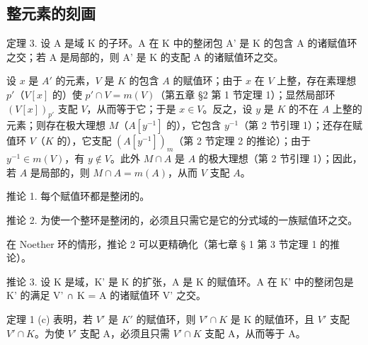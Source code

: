 \subsection{整元素的刻画}

定理 3. 设 A 是域 K 的子环。A 在 K 中的整闭包 A' 是 K 的包含 A 的诸赋值环之交；若 A 是局部的，则 A' 是 K 的支配 A 的诸赋值环之交。

设 \(x\) 是 \(A'\) 的元素，\(V\) 是 \(K\) 的包含 \(A\) 的赋值环；由于 \(x\) 在 \(V\) 上整，存在素理想 \(p'\)（\(V[x]\) 的）使 \(p' \cap V = m(V)\)（第五章 §2 第 1 节定理 1）；显然局部环 \((V[x])_{p'}\) 支配 \(V\)，从而等于它；于是 \(x \in V\)。反之，设 \(y\) 是 \(K\) 的不在 \(A\) 上整的元素；则存在极大理想 \(M\)（\(A[y^{-1}]\) 的），它包含 \(y^{-1}\)（第 2 节引理 1）；还存在赋值环 \(V\)（\(K\) 的），它支配 \((A[y^{-1}])_{m}\)（第 2 节定理 2 的推论）；由于 \(y^{-1} \in m(V)\)，有 \(y \notin V\)。此外 \(M \cap A\) 是 \(A\) 的极大理想（第 2 节引理 1）；因此，若 \(A\) 是局部的，则 \(M \cap A = m(A)\)，从而 \(V\) 支配 \(A\)。

推论 1. 每个赋值环都是整闭的。

推论 2. 为使一个整环是整闭的，必须且只需它是它的分式域的一族赋值环之交。

在 Noether 环的情形，推论 2 可以更精确化（第七章 § 1 第 3 节定理 1 的推论）。

推论 3. 设 K 是域，K' 是 K 的扩张，A 是 K 的赋值环。A 在 K' 中的整闭包是 K' 的满足 V' ∩ K = A 的诸赋值环 V' 之交。

定理 1 (c) 表明，若 \(V'\) 是 \(K'\) 的赋值环，则 \(V' \cap K\) 是 K 的赋值环，且 \(V'\) 支配 \(V' \cap K\)。为使 \(V'\) 支配 A，必须且只需 \(V' \cap K\) 支配 A，从而等于 A。

